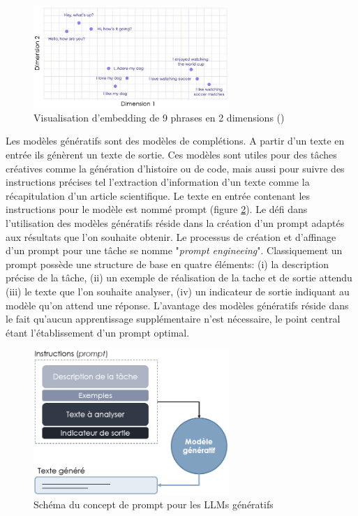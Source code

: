 \begin{figure}[!htbp]
 \centering
 \includegraphics[width=0.66\textwidth]{figures/sentence_embed.png}
 \caption[Visualisation d'embedding de 9 phrases en 2 dimensions]{Visualisation d'embedding de 9 phrases en 2 dimensions (\cite{luis_serrano_what_2023})}
 \label{fig:sentence_embed}
\end{figure}
Les modèles génératifs sont des modèles de complétions. A partir d'un texte en entrée ils génèrent un texte de sortie. Ces modèles sont utiles pour des tâches créatives comme la génération d'histoire ou de code, mais aussi pour suivre des instructions précises tel l'extraction d'information d'un texte comme la récapitulation d'un article scientifique. Le texte en entrée contenant les instructions pour le modèle est nommé prompt (figure \ref{fig:llm-prompt}). Le défi dans l'utilisation des modèles génératifs réside dans la création d'un prompt adaptés aux résultats que l'on souhaite obtenir. Le processus de création et d'affinage d'un prompt pour une tâche se nomme "\textit{prompt engineeing}". Classiquement un prompt possède une structure de base en quatre éléments: (i) la description précise de la tâche, (ii) un exemple de réalisation de la tache et de sortie attendu (iii) le texte que l'on souhaite analyser, (iv) un indicateur de sortie indiquant au modèle qu'on attend une réponse. L'avantage des modèles génératifs réside dans le fait qu'aucun apprentissage supplémentaire n'est nécessaire, le point central étant l'établissement d'un prompt optimal.

\begin{figure}[!htbp]
 \centering
 \includegraphics[width=0.66\textwidth]{figures/promt_llm.png}
 \caption[Schéma du concept de prompt pour les LLMs génératifs]{Schéma du concept de prompt pour les LLMs génératifs}
 \label{fig:llm-prompt}
\end{figure}

